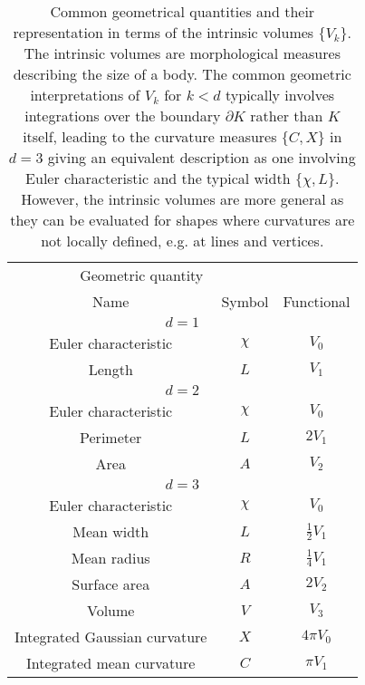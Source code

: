 \begin{SCtable}
  \begin{minipage}[b]{\linewidth}
    \centering
    \begin{tabular}{ccc}
      \toprule
      \multicolumn{2}{c}{Geometric quantity} \\
      \cmidrule(r){1-2}
      Name & Symbol & Functional \\
      \midrule
      \multicolumn{3}{c}{$d = 1$} \\
      \midrule
      Euler characteristic & $\chi$ & $V_0$ \\
      Length & $L$ & $V_1$ \\
      \midrule
      \multicolumn{3}{c}{$d = 2$} \\
      \midrule
      Euler characteristic & $\chi$ & $V_0$ \\
      Perimeter & $L$ & $2 V_1$ \\
      Area & $A$ & $V_2$ \\
      \midrule
      \multicolumn{3}{c}{$d = 3$} \\
      \midrule
      Euler characteristic & $\chi$ & $V_0$ \\
      Mean width & $L$ & $\frac{1}{2} V_1$ \\
      Mean radius & $R$ & $\frac{1}{4} V_1$ \\
      Surface area & $A$ & $2 V_2$ \\
      Volume & $V$ & $V_3$ \\
      Integrated Gaussian curvature & $X$ & $4 \pi V_0$ \\
      Integrated mean curvature & $C$ & $\pi V_1$ \\
      \bottomrule
    \end{tabular}
  \end{minipage}
  \caption[Common geometrical quantities]{
    Common geometrical quantities and their representation in terms of the intrinsic volumes $\{V_k\}$.
    The intrinsic volumes are morphological measures describing the size of a body.
    The common geometric interpretations of $V_k$ for $k < d$ typically involves integrations over the boundary $\partial K$ rather than $K$ itself, leading to the curvature measures $\{C,X\}$ in $d=3$ giving an equivalent description as one involving Euler characteristic and the typical width $\{\chi, L\}$.
    However, the intrinsic volumes are more general as they can be evaluated for shapes where curvatures are not locally defined, e.g. at lines and vertices.}
  \label{table:geometric-quantities}
\end{SCtable}

